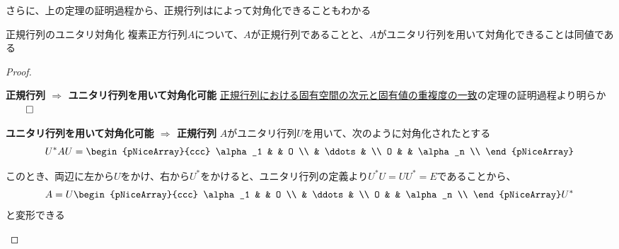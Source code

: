 \documentclass[../../../topic_linear-algebra]{subfiles}
\begin{document}
さらに、上の定理の証明過程から、正規行列はによって対角化できることもわかる

\begin{theorem}{正規行列のユニタリ対角化}
  複素正方行列$A$について、$A$が正規行列であることと、$A$がユニタリ行列を用いて対角化できることは同値である
\end{theorem}

\begin{proof}
  \begin{subpattern}{\bfseries 正規行列 $\Longrightarrow$ ユニタリ行列を用いて対角化可能}
    \hyperref[thm:normal-matrix-eigenvalue-multiplicity]{正規行列における固有空間の次元と固有値の重複度の一致}の定理の証明過程より明らか $\qed$
  \end{subpattern}

  \begin{subpattern}{\bfseries ユニタリ行列を用いて対角化可能 $\Longrightarrow$ 正規行列}
    $A$がユニタリ行列$U$を用いて、次のように対角化されたとする
    \begin{equation*}
      U^* AU =  \begin{pNiceArray}{ccc}
        \alpha_1 & & O \\
        &  \ddots & \\
        O & & \alpha_n \\
      \end{pNiceArray}
    \end{equation*}

    このとき、両辺に左から$U$をかけ、右から$U^*$をかけると、ユニタリ行列の定義より$U^*U = UU^* = E$であることから、
    \begin{equation*}
      A = U \begin{pNiceArray}{ccc}
        \alpha_1 & & O \\
        &  \ddots & \\
        O & & \alpha_n \\
      \end{pNiceArray} U^*
    \end{equation*}
    と変形できる

    \br


\end{subpattern}
\end{proof}
\end{document}
